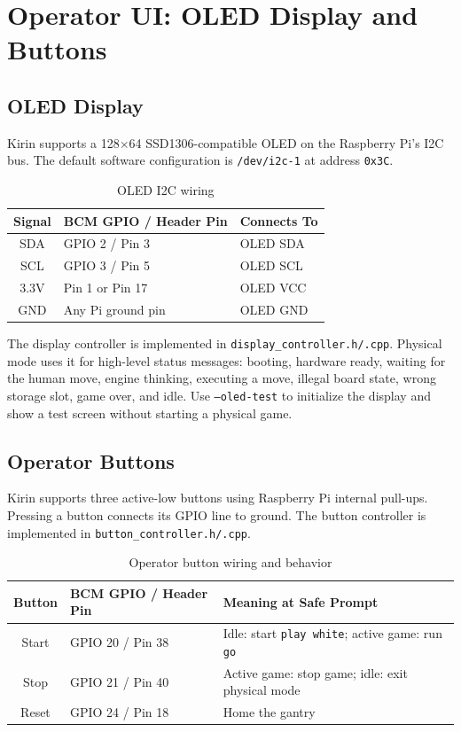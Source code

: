 \documentclass[11pt,a4paper]{report}
\begin{document}
\chapter{Operator UI: OLED Display and Buttons}

\section{OLED Display}

Kirin supports a 128$\times$64 SSD1306-compatible OLED on the Raspberry Pi's I2C bus. The default software configuration is \texttt{/dev/i2c-1} at address \texttt{0x3C}.

\begin{table}[H]
\centering
\begin{tabular}{cll}
\toprule
\textbf{Signal} & \textbf{BCM GPIO / Header Pin} & \textbf{Connects To} \\
\midrule
SDA & GPIO 2 / Pin 3 & OLED SDA \\
SCL & GPIO 3 / Pin 5 & OLED SCL \\
3.3V & Pin 1 or Pin 17 & OLED VCC \\
GND & Any Pi ground pin & OLED GND \\
\bottomrule
\end{tabular}
\caption{OLED I2C wiring}
\end{table}

The display controller is implemented in \texttt{display\_controller.h/.cpp}. Physical mode uses it for high-level status messages: booting, hardware ready, waiting for the human move, engine thinking, executing a move, illegal board state, wrong storage slot, game over, and idle. Use \texttt{--oled-test} to initialize the display and show a test screen without starting a physical game.

\section{Operator Buttons}

Kirin supports three active-low buttons using Raspberry Pi internal pull-ups. Pressing a button connects its GPIO line to ground. The button controller is implemented in \texttt{button\_controller.h/.cpp}.

\begin{table}[H]
\centering
\begin{tabular}{cll}
\toprule
\textbf{Button} & \textbf{BCM GPIO / Header Pin} & \textbf{Meaning at Safe Prompt} \\
\midrule
Start & GPIO 20 / Pin 38 & Idle: start \texttt{play white}; active game: run \texttt{go} \\
Stop & GPIO 21 / Pin 40 & Active game: stop game; idle: exit physical mode \\
Reset & GPIO 24 / Pin 18 & Home the gantry \\
\bottomrule
\end{tabular}
\caption{Operator button wiring and behavior}
\end{table}
\end{document}
